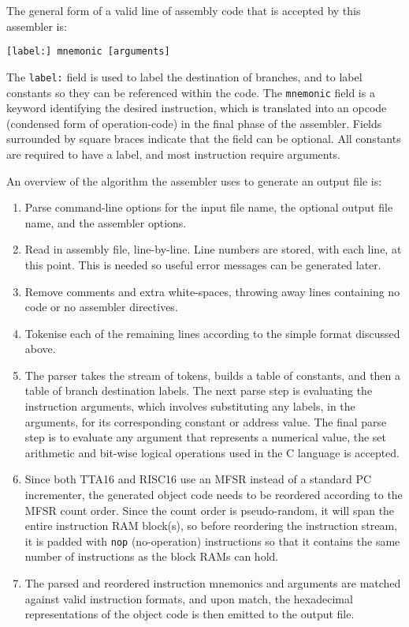 \noindent The general form of a valid line of assembly code that is accepted by
this assembler is:

\begin{center}
\tt		[label:] mnemonic [arguments]
\end{center}

The \texttt{label:} field is used to label the destination of branches, and to
label constants so they can be referenced within the code. The \texttt{mnemonic}
field is a keyword identifying the desired instruction, which is translated into
an opcode (condensed form of operation-code) in the final phase of the
assembler. Fields surrounded by square braces indicate that the field can be
optional. All constants are required to have a label, and most instruction
require arguments.

An overview of the algorithm the assembler uses to generate an output file is:

\begin{enumerate}
  \item Parse command-line options for the input file name, the optional output
  file name, and the assembler options.
  \item Read in assembly file, line-by-line. Line numbers are
  stored, with each line, at this point. This is needed so useful error
  messages can be generated later.
  \item Remove comments and extra white-spaces, throwing away lines containing
  no code or no assembler directives.
  \item Tokenise each of the remaining lines according to the simple format
  discussed above.
  \item The parser takes the stream of tokens, builds a table of constants, and
  then a table of branch destination labels. The next parse step is
  evaluating the instruction arguments, which involves substituting any
  labels, in the arguments, for its corresponding constant or address value.
  The final parse step is to evaluate any argument that represents a numerical
  value, the set arithmetic and bit-wise logical operations used in the C
  language is accepted.
  \item Since both TTA16 and RISC16 use an MFSR instead of a standard PC
  incrementer, the generated object code needs to be reordered according to
  the MFSR count order. Since the count order is pseudo-random, it will span
  the entire instruction RAM block(s), so before reordering the instruction
  stream, it is padded with \texttt{nop} (no-operation) instructions so that it
  contains the same number of instructions as the block RAMs can hold.
  \item The parsed and reordered instruction mnemonics and arguments are
  matched against valid instruction formats, and upon match, the hexadecimal
  representations of the object code is then emitted to the output file.
\end{enumerate}


